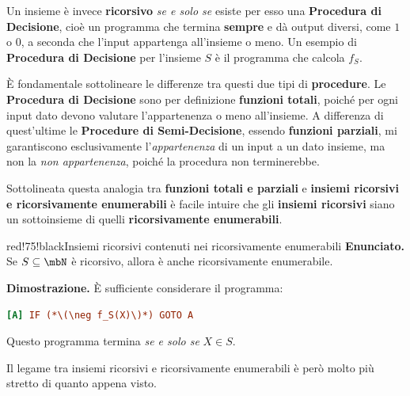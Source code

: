 Un insieme è invece \textbf{ricorsivo} \textit{se e solo se} esiste per esso una \textbf{Procedura di Decisione}, cioè un programma che termina \textbf{sempre} e dà output diversi, come \(1\) o \(0\), a seconda che l'input appartenga all'insieme o meno.
Un esempio di \textbf{Procedura di Decisione} per l'insieme \(S\) è il programma che calcola \(f_S\).

È fondamentale sottolineare le differenze tra questi due tipi di \textbf{procedure}. Le \textbf{Procedura di Decisione} sono per definizione \textbf{funzioni totali}, poiché per ogni input dato devono valutare l'appartenenza o meno all'insieme.
A differenza di quest'ultime le \textbf{Procedure di Semi-Decisione}, essendo \textbf{funzioni parziali}, mi garantiscono esclusivamente l'\textit{appartenenza} di un input a un dato insieme, ma non la \textit{non appartenenza}, poiché la procedura non terminerebbe.

Sottolineata questa analogia tra \textbf{funzioni totali e parziali} e \textbf{insiemi ricorsivi e ricorsivamente enumerabili} è facile intuire che gli \textbf{insiemi ricorsivi} siano un sottoinsieme di quelli \textbf{ricorsivamente enumerabili}.
\begin{halfframedbox}{red!75!black}{Insiemi ricorsivi contenuti nei ricorsivamente enumerabili}\label{Ricorsivi Contenuti in Enumerabili}
  \textbf{Enunciato. } Se \(S \subseteq \mbN\) è ricorsivo, allora è anche ricorsivamente enumerabile.
  \begin{center}
    \textcolor{red!75!black}{\hdashrule[0.5ex]{18cm}{1pt}{3mm 3pt 1mm 2pt}}
  \end{center}
  \textbf{Dimostrazione. } È sufficiente considerare il programma:
  \begin{lstlisting}[language=ini, caption={ }]
  [A] IF (*\(\neg f_S(X)\)*) GOTO A
  \end{lstlisting}
  Questo programma termina \textit{se e solo se} \(X \in S\).
\end{halfframedbox}
\newpage

Il legame tra insiemi ricorsivi e ricorsivamente enumerabili è però molto più stretto di quanto appena visto.

